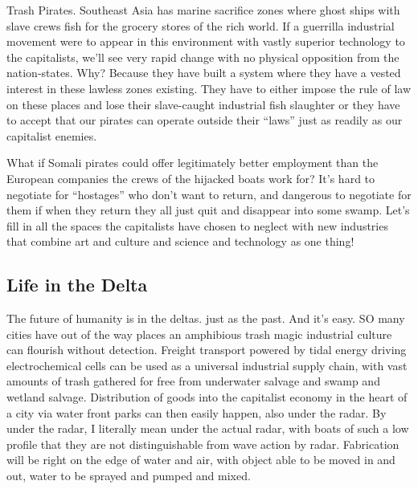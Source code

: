 Trash Pirates. Southeast Asia has marine sacrifice zones where ghost
ships with slave crews fish for the grocery stores of the rich world. If
a guerrilla industrial movement were to appear in this environment with
vastly superior technology to the capitalists, we'll see very rapid
change with no physical opposition from the nation-states. Why? Because
they have built a system where they have a vested interest in these
lawless zones existing. They have to either impose the rule of law on
these places and lose their slave-caught industrial fish slaughter or
they have to accept that our pirates can operate outside their ``laws''
just as readily as our capitalist enemies.

What if Somali pirates could offer legitimately better employment than
the European companies the crews of the hijacked boats work for? It's
hard to negotiate for ``hostages'' who don't want to return, and
dangerous to negotiate for them if when they return they all just quit
and disappear into some swamp. Let's fill in all the spaces the
capitalists have chosen to neglect with new industries that combine art
and culture and science and technology as one thing!

\subsection{Life in the Delta}\label{life-in-the-delta}

The future of humanity is in the deltas. just as the past. And it's
easy. SO many cities have out of the way places an amphibious trash
magic industrial culture can flourish without detection. Freight
transport powered by tidal energy driving electrochemical cells can be
used as a universal industrial supply chain, with vast amounts of trash
gathered for free from underwater salvage and swamp and wetland salvage.
Distribution of goods into the capitalist economy in the heart of a city
via water front parks can then easily happen, also under the radar. By
under the radar, I literally mean under the actual radar, with boats of
such a low profile that they are not distinguishable from wave action by
radar. Fabrication will be right on the edge of water and air, with
object able to be moved in and out, water to be sprayed and pumped and
mixed.

